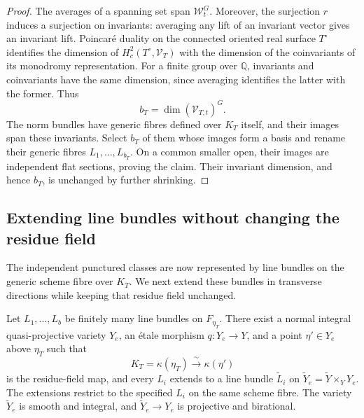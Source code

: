\begin{proof}
The averages of a spanning set span $\mathcal W_t^G$.  Moreover,
the surjection $r$ induces a surjection on invariants: averaging any
lift of an invariant vector gives an invariant lift.  Poincar\'e
duality on the connected oriented real surface $T^\circ$ identifies
the dimension of $H_c^2(T^\circ,\mathcal V_T)$ with the dimension of
the coinvariants of its monodromy representation.  For a finite
group over $\mathbb Q$, invariants and coinvariants have the same
dimension, since averaging identifies the latter with the former.
Thus
\[
 b_T=\dim(\mathcal V_{T,t})^G.
\]
The norm bundles have generic fibres defined over $K_T$ itself, and
their images span these invariants.  Select $b_T$ of them whose
images form a basis and rename their generic fibres $L_1,\ldots,L_{b_T}$.
On a common smaller open, their images are independent flat
sections, proving the claim.  Their invariant dimension, and hence
$b_T$, is unchanged by further shrinking.
\end{proof}

\subsection{Extending line bundles without changing the residue field}

The independent punctured classes are now represented by line bundles
on the generic scheme fibre over $K_T$.  We next extend these bundles
in transverse directions while keeping that residue field unchanged.

\begin{lemma}\label{local:etale-lines}
Let $L_1,\ldots,L_b$ be finitely many line bundles on $F_{\eta_T}$.
There exist a normal integral quasi-projective variety $Y_e$, an
\'etale morphism $q:Y_e\to Y$, and a point
$\eta'\in Y_e$ above $\eta_T$ such that
\[
 K_T=\kappa(\eta_T)\xrightarrow{\ \sim\ }\kappa(\eta')
\]
is the residue-field map, and every $L_i$ extends to a line bundle
$\widetilde L_i$ on
$\widetilde Y_e=\widetilde Y\times_Y Y_e$.  The extensions restrict
to the specified $L_i$ on the same scheme fibre.  The variety
$\widetilde Y_e$ is smooth and integral, and
$\widetilde Y_e\to Y_e$ is projective and birational.
\end{lemma}

